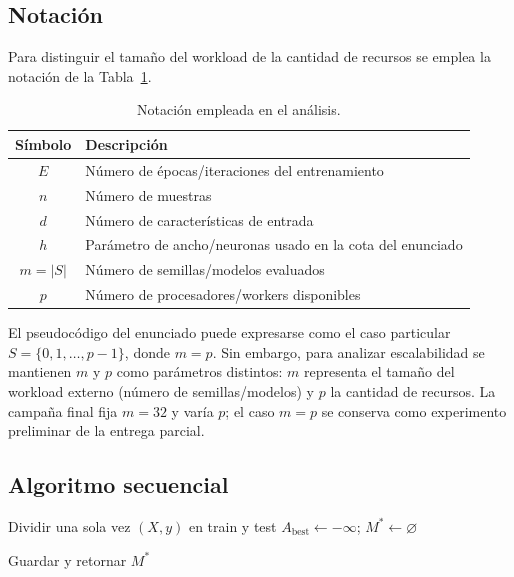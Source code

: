 \documentclass[11pt,a4paper]{article}
\begin{document}
\subsection{Notación}

Para distinguir el tamaño del workload de la cantidad de recursos se emplea la
notación de la Tabla~\ref{tab:notacion}.

\begin{table}[H]
\centering
\begin{tabular}{cl}
\toprule
Símbolo & Descripción \\
\midrule
$E$ & Número de épocas/iteraciones del entrenamiento \\
$n$ & Número de muestras \\
$d$ & Número de características de entrada \\
$h$ & Parámetro de ancho/neuronas usado en la cota del enunciado \\
$m=|S|$ & Número de semillas/modelos evaluados \\
$p$ & Número de procesadores/workers disponibles \\
\bottomrule
\end{tabular}
\caption{Notación empleada en el análisis.}
\label{tab:notacion}
\end{table}

El pseudocódigo del enunciado puede expresarse como el caso particular
$S=\{0,1,\ldots,p-1\}$, donde $m=p$. Sin embargo, para analizar escalabilidad se
mantienen $m$ y $p$ como parámetros distintos: $m$ representa el tamaño del workload
externo (número de semillas/modelos) y $p$ la cantidad de recursos. La campaña final
fija $m=32$ y varía $p$; el caso $m=p$ se conserva como experimento
preliminar de la entrega parcial.

\subsection{Algoritmo secuencial}

\begin{algorithm}[H]
\caption{Entrenamiento secuencial de múltiples MLP con semillas distintas}
\label{alg:secuencial}

Dividir una sola vez $(X,y)$ en train y test\;
$A_{\mathrm{best}}\leftarrow -\infty$; $M^*\leftarrow \varnothing$\;

Guardar y retornar $M^*$\;
\end{algorithm}
\end{document}
